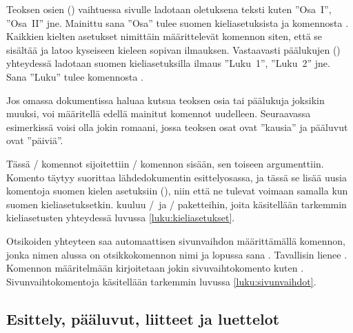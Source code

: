 Teoksen osien () vaihtuessa sivulle ladotaan oletuksena
teksti kuten ''Osa~I'', ''Osa~II'' jne. Mainittu sana ''Osa'' tulee
suomen kieliasetuksista ja komennosta . Kaikkien
kielten asetukset nimittäin määrittelevät komennon 
siten, että se sisältää ja latoo kyseiseen kieleen sopivan ilmauksen.
Vastaavasti päälukujen () yhteydessä ladotaan suomen
kieliasetuksilla ilmaus ''Luku~1'', ''Luku~2'' jne. Sana ''Luku'' tulee
komennosta .

Jos omassa dokumentissa haluaa kutsua teoksen osia tai päälukuja
joksikin muuksi, voi määritellä edellä mainitut komennot uudelleen.
Seuraavassa esimerkissä voisi olla jokin romaani, jossa teoksen osat
ovat ''kausia'' ja pääluvut ovat ''päiviä''.

\begin{koodilohkosis}
\addto{\captionsfinnish}{
  \renewcommand{\partname}{Kausi}
  \renewcommand{\chaptername}{Päivä}
}
\end{koodilohkosis}

Tässä \-/ komennot sijoitettiin \-/
komennon sisään, sen toiseen argumenttiin. Komento 
täytyy suorittaa lähdedokumentin esittelyosassa, ja tässä se lisää uusia
komentoja suomen kielen asetuksiin (), niin
että ne tulevat voimaan samalla kun suomen kieliasetuksetkin.
 kuuluu \-/\ ja \-/
paketteihin, joita käsitellään tarkemmin kieliasetusten yhteydessä
luvussa \ref{luku:kieliasetukset}.

Otsikoiden yhteyteen saa automaattisen sivunvaihdon määrittämällä
komennon, jonka nimen alussa on otsikkokomennon nimi ja lopussa sana
. Tavallisin lienee . Komennon
määritelmään kirjoitetaan jokin sivuvaihtokomento kuten
. Sivunvaihtokomentoja käsitellään tarkemmin luvussa
\ref{luku:sivunvaihdot}.

\begin{koodilohkosis}
\newcommand{\sectionbreak}{\clearpage}
\end{koodilohkosis}

\subsection{Esittely, pääluvut, liitteet ja luettelot}
\label{luku:frontmainbackmatter}

